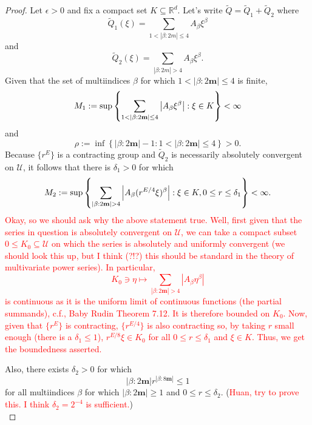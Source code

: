 \documentclass[11pt]{article}
\theoremstyle{remark}
\begin{document}
\begin{proof}
Let $\epsilon > 0$ and fix a compact set $K\subseteq\mathbb{R}^d$. Let's write $\widetilde{Q}=\widetilde{Q}_1+\widetilde{Q}_2$ where
\begin{equation*}
    \widetilde{Q}_1(\xi)=\sum_{1< |\beta:2m|\leq 4}A_{\beta}\xi^\beta
\end{equation*}
and
\begin{equation*}
    \widetilde{Q}_2(\xi)=\sum_{ |\beta:2m|>4}A_{\beta}\xi^\beta.
\end{equation*}
Given that the set of multiindices $\beta$ for which  $1<|\beta:2\mathbf{m}|\leq 4$ is finite, 
\begin{equation*}
    M_1:=\sup\left\{\sum_{1<|\beta:2\mathbf{m}|\leq 4} \abs{A_\beta\xi^\beta}:\xi\in K\right\}<\infty
\end{equation*}
and
\begin{equation*}
    \rho:=\inf\left\{|\beta:2\mathbf{m}|-1:1<|\beta:2\mathbf{m}|\leq 4\right\}>0.
\end{equation*}
Because $\{r^E\}$ is a contracting group and $\widetilde{Q}_2$ is necessarily absolutely convergent on $\mathcal{U}$, it follows that there is $\delta_1>0$ for which
\begin{equation*}
    M_2:=\sup\left\{\sum_{|\beta:2\mathbf{m}|>4}\abs{A_\beta(r^{E/4}\xi)^\beta}:\xi\in K, 0\leq r\leq\delta_1\right\}<\infty.
\end{equation*}
\textcolor{red}{Okay, so we should ask why the above statement true. Well, first given that the series in question is absolutely convergent on $\mathcal{U}$, we can take a compact subset $0\leq K_0\subseteq \mathcal{U}$ on which the series is absolutely and uniformly convergent (we should look this up, but I think (?!?) this should be standard in the theory of multivariate power series). In particular,
\begin{equation*}
    K_0\ni \eta\mapsto \sum_{|\beta:2\mathbf{m}|>4}|A_{\beta}\eta^\beta|
\end{equation*}
is continuous as it is the uniform limit of continuous functions (the partial summands), c.f., Baby Rudin Theorem 7.12. It is therefore bounded on $K_0$.
Now, given that $\{r^E\}$ is contracting, $\{r^{E/4}\}$ is also contracting so, by taking $r$ small enough (there is a $\delta_1\leq 1$), $r^{E/8}\xi \in K_0$ for all $0\leq r\leq \delta_1$ and $\xi\in K$. Thus, we get the boundedness asserted.}

Also, there exists $\delta_2>0$ for which
   \begin{equation*}
       |\beta:2\mathbf{m}|r^{|\beta:8\mathbf{m}|}\leq 1
   \end{equation*}
   for all multiindices $\beta$ for which $|\beta:2\mathbf{m}|\geq 1$ and $0\leq r\leq \delta_2$.
(\textcolor{red}{Huan, try to prove this. I think $\delta_2=2^{-4}$ is sufficient.})\\


\end{proof}
\end{document}
